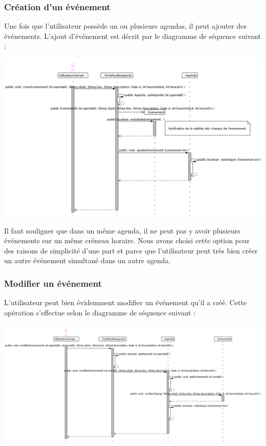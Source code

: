 \documentclass[12pt , a4paper]{article}
\begin{document}
\begin{landscape}
\subsubsection{Création d'un événement}
\noindent Une fois que l'utilisateur possède un ou plusieurs agendas, il peut ajouter des événements. L'ajout d'événement est décrit par le diagramme de séquence suivant :
\begin{center}
  \includegraphics[scale=0.55]{./images/diag_seq_creation_evenement.png}
\end{center}
\noindent Il faut souligner que dans  un m\^eme agenda, il ne peut pas y avoir plusieurs  événements sur un m\^eme créneau horaire. Nous avons choisi cette option  pour des raisons de simplicité d'une
part et parce que l'utilisateur peut très bien créer un autre événement simultané dans un autre agenda.
\end{landscape}

\begin{landscape}
\subsubsection{Modifier un événement}
\noindent L'utilisateur peut bien évidemment modifier un événement qu'il a créé. Cette opération s'effectue selon le diagramme de séquence suivant :
\begin{center}
  \includegraphics[scale=0.55]{./images/diag_seq_modifier_evt.jpg}
\end{center}
\end{landscape}
\end{document}
